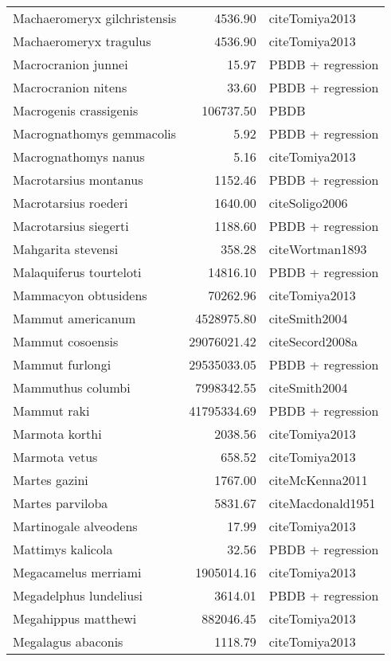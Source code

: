 \begin{table}[ht]
\begin{tabular}{lrl}
  Machaeromeryx gilchristensis & 4536.90 & cite{Tomiya2013} \\ 
  Machaeromeryx tragulus & 4536.90 & cite{Tomiya2013} \\ 
  Macrocranion junnei & 15.97 & PBDB + regression \\ 
  Macrocranion nitens & 33.60 & PBDB + regression \\ 
  Macrogenis crassigenis & 106737.50 & PBDB \\ 
  Macrognathomys gemmacolis & 5.92 & PBDB + regression \\ 
  Macrognathomys nanus & 5.16 & cite{Tomiya2013} \\ 
  Macrotarsius montanus & 1152.46 & PBDB + regression \\ 
  Macrotarsius roederi & 1640.00 & cite{Soligo2006} \\ 
  Macrotarsius siegerti & 1188.60 & PBDB + regression \\ 
  Mahgarita stevensi & 358.28 & cite{Wortman1893} \\ 
  Malaquiferus tourteloti & 14816.10 & PBDB + regression \\ 
  Mammacyon obtusidens & 70262.96 & cite{Tomiya2013} \\ 
  Mammut americanum & 4528975.80 & cite{Smith2004} \\ 
  Mammut cosoensis & 29076021.42 & cite{Secord2008a} \\ 
  Mammut furlongi & 29535033.05 & PBDB + regression \\ 
  Mammuthus columbi & 7998342.55 & cite{Smith2004} \\ 
  Mammut raki & 41795334.69 & PBDB + regression \\ 
  Marmota korthi & 2038.56 & cite{Tomiya2013} \\ 
  Marmota vetus & 658.52 & cite{Tomiya2013} \\ 
  Martes gazini & 1767.00 & cite{McKenna2011} \\ 
  Martes parviloba & 5831.67 & cite{Macdonald1951} \\ 
  Martinogale alveodens & 17.99 & cite{Tomiya2013} \\ 
  Mattimys kalicola & 32.56 & PBDB + regression \\ 
  Megacamelus merriami & 1905014.16 & cite{Tomiya2013} \\ 
  Megadelphus lundeliusi & 3614.01 & PBDB + regression \\ 
  Megahippus matthewi & 882046.45 & cite{Tomiya2013} \\ 
  Megalagus abaconis & 1118.79 & cite{Tomiya2013} \\ 

\end{tabular}
\end{table}

